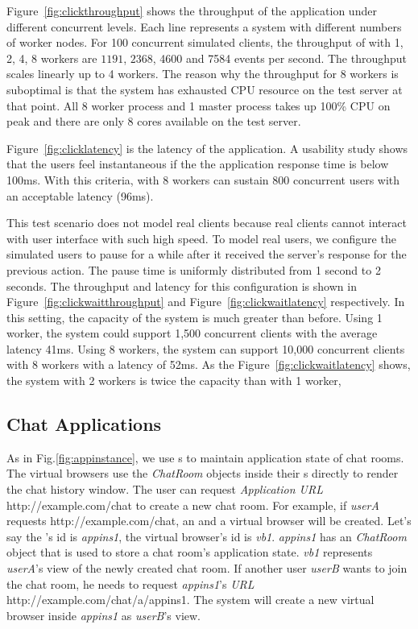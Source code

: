 Figure~\ref{fig:clickthroughput} shows the throughput of the application 
under different concurrent levels.
Each line represents a \cb{} system with different numbers of worker nodes.
For 100 concurrent simulated clients, 
the throughput of \cb{} with 1, 2, 4, 8 workers are $1191$, $2368$, 4600 and 7584 events
per second.
The throughput scales linearly up to 4 workers.
The reason why the throughput for 8 workers is suboptimal is that the
system has exhausted CPU resource on the test server at that point.
All 8 worker process and 1 master process takes up 100\% CPU on peak and there are
only 8 cores available on the test server.

\clicklatency{}

Figure~\ref{fig:clicklatency} is the latency of the application.
A usability study shows that the users feel instantaneous if the 
the application response time is below 100ms.
With this criteria,
\cb{} with 8 workers can sustain 800 concurrent users with an acceptable latency (96ms).

This test scenario does not model real clients because real clients cannot 
interact with user interface with such high speed.
To model real users, we configure the simulated users to pause for a while
after it received the server's response for the previous action.
The pause time is uniformly distributed from 1 second to 2 seconds.
The throughput and latency for this configuration is shown 
in Figure~\ref{fig:clickwaitthroughput} and Figure~\ref{fig:clickwaitlatency} respectively.
In this setting, the capacity of the system is much greater than before.
Using 1 worker, the system could support 1,500 concurrent clients with the average latency 41ms.
Using 8 workers, 
the system can support 10,000 concurrent clients with 8 workers with a latency of 52ms.
As the Figure~\ref{fig:clickwaitlatency} shows, 
the system with 2 workers is twice the capacity than with 1 worker,



\clickwaitthroughput{}
\clickwaitlatency{}

\subsection{Chat Applications}
As in Fig.\ref{fig:appinstance},
we use \appins{}s to maintain application state of chat rooms.
The virtual browsers use the \emph{ChatRoom} objects inside their \appins{}s 
directly to render the chat history window.
The user can request \emph{Application URL} http://example.com/chat
to create a new chat room.
For example, if 
\emph{userA} requests http://example.com/chat,
an \appins{} and a virtual browser will be created.
Let's say the \appins{}'s id is \emph{appins1},
the virtual browser's id is \emph{vb1}.
\emph{appins1} has an \emph{ChatRoom} object that is used to store 
a chat room's application state.
\emph{vb1} represents \emph{userA}'s view of the newly created
chat room.
If another user \emph{userB} wants to join the chat room, 
he needs to request \emph{appins1}'s \emph{\appins{} URL} 
http://example.com/chat/a/appins1.
The system will create a new virtual browser inside \emph{appins1}
as \emph{userB}'s view.


